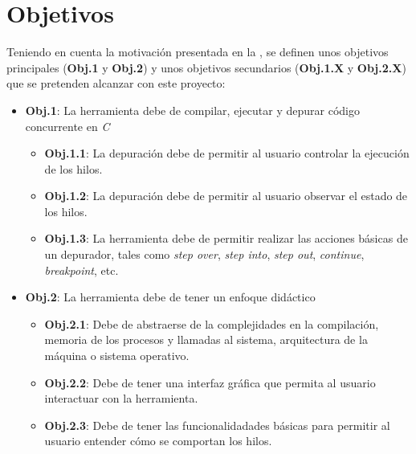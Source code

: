 \section{Objetivos}\label{sec:objetivos}
Teniendo en cuenta la motivación presentada en la , se definen unos objetivos principales (\textbf{Obj.1} y \textbf{Obj.2}) y unos objetivos secundarios (\textbf{Obj.1.X} y \textbf{Obj.2.X}) que se pretenden alcanzar con este proyecto:
\begin{itemize}

    \item \textbf{Obj.1}: La herramienta debe de compilar, ejecutar y depurar código concurrente en \textit{C}
    \begin{itemize}
        \item \textbf{Obj.1.1}: La depuración debe de permitir al usuario controlar la ejecución de los hilos.
        \item \textbf{Obj.1.2}: La depuración debe de permitir al usuario observar el estado de los hilos.
        \item \textbf{Obj.1.3}: La herramienta debe de permitir realizar las acciones básicas de un depurador, tales como \textit{step over}, \textit{step into}, \textit{step out}, \textit{continue}, \textit{breakpoint}, etc.
    \end{itemize}
     
    \item \textbf{Obj.2}: La herramienta debe de tener un enfoque didáctico\label{obj:didactico}
    \begin{itemize}
        \item \textbf{Obj.2.1}: Debe de abstraerse de la complejidades en la compilación, memoria de los procesos y llamadas al sistema, arquitectura de la máquina o sistema operativo.
        \item \textbf{Obj.2.2}: Debe de tener una \gls{interfaz gráfica} que permita al usuario interactuar con la herramienta.
        \item \textbf{Obj.2.3}: Debe de tener las funcionalidadades básicas para permitir al usuario entender cómo se comportan los hilos.
    \end{itemize}

\end{itemize}

